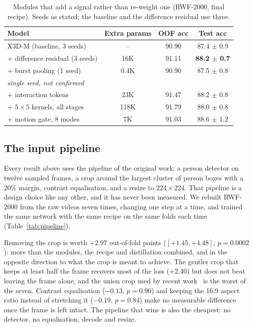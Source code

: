 \documentclass[conference]{IEEEtran}
\begin{document}
\begin{table}[t]
  \centering
  \caption{Modules that add a signal rather than re-weight one (RWF-2000, final
  recipe). Seeds as stated; the baseline and the difference residual use three.}
  \label{tab:newmodules}
  \setlength{\tabcolsep}{2.5pt}
  \begin{tabular}{lccc}
    \toprule
    Model & Extra params & OOF acc & Test acc \\
    \midrule
    X3D-M (baseline, 3 seeds)        & --    & 90.90 & 87.4 $\pm$ 0.9 \\
    + difference residual (3 seeds)  & 16K   & 91.11 & \textbf{88.2 $\pm$ 0.7} \\
    + burst pooling (1 seed)         & 0.4K  & 90.90 & 87.5 $\pm$ 0.8 \\
    \midrule
    \multicolumn{4}{l}{\emph{single seed, not confirmed}} \\
    + interaction tokens             & 23K   & 91.47 & 88.2 $\pm$ 0.8 \\
    + $5\times5$ kernels, all stages  & 118K  & 91.79 & 88.0 $\pm$ 0.8 \\
    + motion gate, 8 modes           & 7K    & 91.03 & 88.6 $\pm$ 1.2 \\
    \bottomrule
  \end{tabular}
\end{table}

\subsection{The input pipeline}
\label{sec:pipeline}

Every result above uses the pipeline of the original work: a person
detector on twelve sampled frames, a crop around the largest cluster of
person boxes with a 20\% margin, contrast equalisation, and a resize to
$224\times224$. That pipeline is a design choice like any other, and it has
never been measured. We rebuilt RWF-2000 from the raw videos seven times,
changing one step at a time, and trained the same network with the same
recipe on the same folds each time (Table~\ref{tab:pipeline}).

Removing the crop is worth $+2.97$ out-of-fold points
($[+1.45, +4.48]$, $p=0.0002$): more than the modules, the recipe and
distillation combined, and in the opposite direction to what the crop is
meant to achieve. The gentler crop that keeps at least half the frame
recovers most of the loss ($+2.40$) but does not beat leaving the frame
alone, and the union crop used by recent work~\cite{cuenet} is the worst
of the seven. Contrast equalisation ($-0.13$, $p=0.90$) and keeping the
16:9 aspect ratio instead of stretching it ($-0.19$, $p=0.84$) make no
measurable difference once the frame is left intact. The pipeline that
wins is also the cheapest: no detector, no equalisation, decode and
resize.
\end{document}
